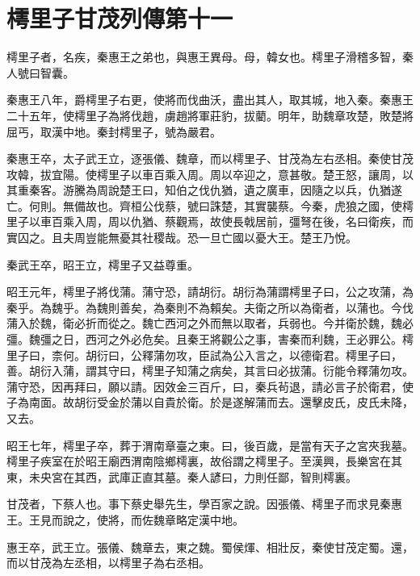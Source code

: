 \chapter{樗里子甘茂列傳第十一}

樗里子者，名疾，秦惠王之弟也，與惠王異母。母，韓女也。樗里子滑稽多智，秦人號曰智囊。

秦惠王八年，爵樗里子右更，使將而伐曲沃，盡出其人，取其城，地入秦。秦惠王二十五年，使樗里子為將伐趙，虜趙將軍莊豹，拔藺。明年，助魏章攻楚，敗楚將屈丐，取漢中地。秦封樗里子，號為嚴君。

秦惠王卒，太子武王立，逐張儀、魏章，而以樗里子、甘茂為左右丞相。秦使甘茂攻韓，拔宜陽。使樗里子以車百乘入周。周以卒迎之，意甚敬。楚王怒，讓周，以其重秦客。游騰為周說楚王曰，知伯之伐仇猶，遺之廣車，因隨之以兵，仇猶遂亡。何則。無備故也。齊桓公伐蔡，號曰誅楚，其實襲蔡。今秦，虎狼之國，使樗里子以車百乘入周，周以仇猶、蔡觀焉，故使長戟居前，彊弩在後，名曰衛疾，而實囚之。且夫周豈能無憂其社稷哉。恐一旦亡國以憂大王。楚王乃悅。

秦武王卒，昭王立，樗里子又益尊重。

昭王元年，樗里子將伐蒲。蒲守恐，請胡衍。胡衍為蒲謂樗里子曰，公之攻蒲，為秦乎。為魏乎。為魏則善矣，為秦則不為賴矣。夫衛之所以為衛者，以蒲也。今伐蒲入於魏，衛必折而從之。魏亡西河之外而無以取者，兵弱也。今并衛於魏，魏必彊。魏彊之日，西河之外必危矣。且秦王將觀公之事，害秦而利魏，王必罪公。樗里子曰，柰何。胡衍曰，公釋蒲勿攻，臣試為公入言之，以德衛君。樗里子曰，善。胡衍入蒲，謂其守曰，樗里子知蒲之病矣，其言曰必拔蒲。衍能令釋蒲勿攻。蒲守恐，因再拜曰，願以請。因效金三百斤，曰，秦兵茍退，請必言子於衛君，使子為南面。故胡衍受金於蒲以自貴於衛。於是遂解蒲而去。還擊皮氏，皮氏未降，又去。

昭王七年，樗里子卒，葬于渭南章臺之東。曰，後百歲，是當有天子之宮夾我墓。樗里子疾室在於昭王廟西渭南陰鄉樗裏，故俗謂之樗里子。至漢興，長樂宮在其東，未央宮在其西，武庫正直其墓。秦人諺曰，力則任鄙，智則樗裏。

甘茂者，下蔡人也。事下蔡史舉先生，學百家之說。因張儀、樗里子而求見秦惠王。王見而說之，使將，而佐魏章略定漢中地。

惠王卒，武王立。張儀、魏章去，東之魏。蜀侯煇、相壯反，秦使甘茂定蜀。還，而以甘茂為左丞相，以樗里子為右丞相。


